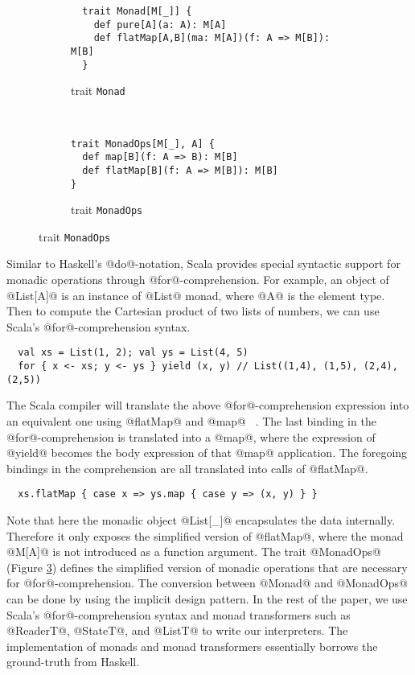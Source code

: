 \begin{figure}[h!]
  \centering
  \begin{subfigure}[b]{0.55\textwidth}
    \begin{lstlisting}
  trait Monad[M[_]] {                                  
    def pure[A](a: A): M[A]                            
    def flatMap[A,B](ma: M[A])(f: A => M[B]): M[B]     
  }                                                    
    \end{lstlisting}
    \caption{trait \texttt{Monad}} \label{fig:monad}
  \end{subfigure}
  ~
  \begin{subfigure}[b]{0.4\textwidth}
    \begin{lstlisting}
trait MonadOps[M[_], A] {
  def map[B](f: A => B): M[B]
  def flatMap[B](f: A => M[B]): M[B]
}
    \end{lstlisting}
    \caption{trait \texttt{MonadOps}} \label{fig:monadops}
  \end{subfigure}
\end{figure}

Similar to Haskell's @do@-notation, Scala provides special syntactic support for
monadic operations through @for@-comprehension.
For example, an object of @List[A]@ is an instance of @List@ monad, where @A@ is the element type. 
Then to compute the Cartesian product of two lists of numbers, we can use Scala's
@for@-comprehension syntax.

\begin{lstlisting}
  val xs = List(1, 2); val ys = List(4, 5)
  for { x <- xs; y <- ys } yield (x, y) // List((1,4), (1,5), (2,4), (2,5))
\end{lstlisting}

The Scala compiler will translate the above @for@-comprehension expression into
an equivalent one using @flatMap@ and @map@ ~\cite{scala_spec}. The last binding
in the @for@-comprehension is translated into a @map@, where the expression of
@yield@ becomes the body expression of that @map@ application. The foregoing
bindings in the comprehension are all translated into calls of @flatMap@.

\begin{lstlisting}
  xs.flatMap { case x => ys.map { case y => (x, y) } }
\end{lstlisting}

Note that here the monadic object @List[_]@ encapsulates the data internally.
Therefore it only exposes the simplified version of @flatMap@, where the
monad @M[A]@ is not introduced as a function argument. The trait @MonadOps@
(Figure \ref{fig:monadops}) defines the simplified version of monadic
operations that are necessary for @for@-comprehension. 
The conversion between @Monad@ and @MonadOps@ can be done by using the implicit design pattern.
In the rest of the paper, we use Scala's @for@-comprehension syntax and monad
transformers such as @ReaderT@, @StateT@, and @ListT@ to write our interpreters.
The implementation of monads and monad transformers essentially borrows the
ground-truth from Haskell.

